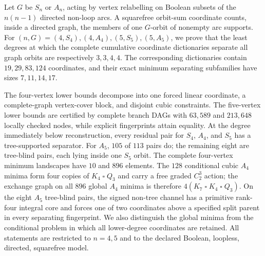 Let $G$ be $S_n$ or $A_n$, acting by vertex relabelling on Boolean subsets
of the $n(n-1)$ directed non-loop arcs.  A squarefree orbit-sum coordinate
counts, inside a directed graph, the members of one $G$-orbit of nonempty arc
supports.  For $(n,G)=(4,S_4),(4,A_4),(5,S_5),(5,A_5)$, we prove that the
least degrees at which the complete cumulative coordinate dictionaries
separate all graph orbits are respectively $3,3,4,4$.  The corresponding
dictionaries contain $19,29,83,124$ coordinates, and their exact minimum
separating subfamilies have sizes $7,11,14,17$.

The four-vertex lower bounds decompose into one forced linear coordinate, a
complete-graph vertex-cover block, and disjoint cubic constraints.  The
five-vertex lower bounds are certified by complete branch DAGs with
$63{,}589$ and $213{,}648$ locally checked nodes, while explicit fingerprints
attain equality.  At the degree immediately below reconstruction, every
residual pair for $S_4$, $A_4$, and $S_5$ has a tree-supported separator.  For
$A_5$, $105$ of $113$ pairs do; the remaining eight are tree-blind pairs, each lying inside one $S_5$
orbit.  The complete four-vertex minimum landscapes have
$10$ and $896$ elements.  The $128$ conditional cubic $A_4$ minima form four
copies of $K_4\mathbin{\square}Q_3$ and carry a free graded $C_2^3$ action;
the exchange graph on all $896$ global $A_4$ minima is therefore
$4(K_7\mathbin{\square}K_4\mathbin{\square}Q_3)$.  On the eight $A_5$
tree-blind pairs, the signed non-tree channel has a primitive rank-four
integral core and forces one of two coordinates above a specified split
parent in every separating fingerprint.  We also distinguish the global
minima from the conditional problem in which all lower-degree coordinates are
retained.  All statements are restricted to $n=4,5$ and to the declared
Boolean, loopless, directed, squarefree model.
